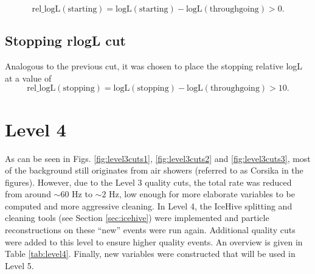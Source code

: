 \begin{equation}
\textrm{rel\_logL}(\textrm{starting}) = \textrm{logL}(\textrm{starting}) - \textrm{logL}(\textrm{throughgoing}) > 0. 
\end{equation}

\subsection{Stopping rlogL cut}
Analogous to the previous cut, it was chosen to place the stopping relative logL at a value of
\begin{equation}
\textrm{rel\_logL}(\textrm{stopping}) = \textrm{logL}(\textrm{stopping}) - \textrm{logL}(\textrm{throughgoing}) > 10. 
\end{equation}


\section{Level 4}
As can be seen in Figs. \ref{fig:level3cuts1}, \ref{fig:level3cuts2} and \ref{fig:level3cuts3}, most of the background still originates from air showers (referred to as Corsika in the figures). However, due to the Level 3 quality cuts, the total rate was reduced from around $\sim 60$ Hz to $\sim2$ Hz, low enough for more elaborate variables to be computed and more aggressive cleaning. In Level 4, the IceHive splitting and cleaning tools (see Section \ref{sec:icehive}) were implemented and particle reconstructions on these ``new'' events were run again. Additional quality cuts were added to this level to ensure higher quality events. An overview is given in Table \ref{tab:level4}. Finally, new variables were constructed that will be used in Level 5.

